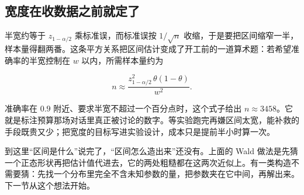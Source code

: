 \subsection{宽度在收数据之前就定了}

半宽约等于 \(z_{1-\alpha/2}\) 乘标准误，而标准误按 \(1/\sqrt n\) 收缩，于是要把区间缩窄一半，样本量得翻两番。这条平方关系把区间估计变成了开工前的一道算术题：若希望准确率的半宽控制在 \(w\) 以内，所需样本量约为

\[
n\approx\frac{z_{1-\alpha/2}^{2}\,\theta(1-\theta)}{w^{2}} .
\]

准确率在 \(0.9\) 附近、要求半宽不超过一个百分点时，这个式子给出 \(n\approx 3458\)。它就是标注预算那场对话里真正被讨论的数字。等实验跑完再嫌区间太宽，能补救的手段既贵又少；把宽度的目标写进实验设计，成本只是提前半小时算一次。

到这里``区间是什么''说完了，``区间怎么造出来''还没有。上面的 Wald 做法是先猜一个正态形状再把估计值代进去，它的两处粗糙都在这两次近似上。有一类构造不需要猜：先找一个分布里完全不含未知参数的量，把参数夹在它中间，再解出来。下一节从这个想法开始。
